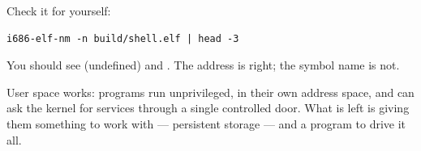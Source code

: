 \begin{tryit}
Check it for yourself:
\begin{lstlisting}[style=sh]
i686-elf-nm -n build/shell.elf | head -3
\end{lstlisting}
You should see  (undefined) and . The address is right; the
symbol name is not.
\end{tryit}

\begin{summary}
User space works: programs run unprivileged, in their own address space, and can ask the kernel for
services through a single controlled door. What is left is giving them something to work with ---
persistent storage --- and a program to drive it all.
\end{summary}
